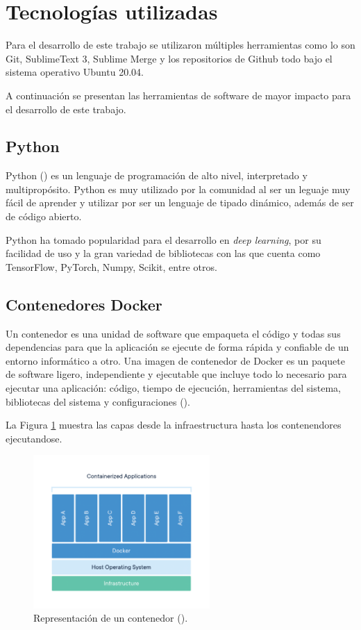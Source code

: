 \section{Tecnologías utilizadas}

Para el desarrollo de este trabajo se utilizaron múltiples herramientas como lo son Git, SublimeText 3, Sublime Merge y los repositorios de Github todo bajo el sistema operativo Ubuntu 20.04.

A continuación se presentan las herramientas de software de mayor impacto para el desarrollo de este trabajo.

\subsection{Python}

Python (\cite{python}) es un lenguaje de programación de alto nivel, interpretado y multipropósito. Python es muy utilizado por  la comunidad al ser un leguaje muy fácil de aprender y utilizar por ser un lenguaje de tipado dinámico, además de ser de código abierto.

Python ha tomado popularidad para el desarrollo en \textit{deep learning}, por su facilidad de uso y la gran variedad de bibliotecas con las que cuenta como TensorFlow, PyTorch, Numpy, Scikit, entre otros.

\subsection{Contenedores Docker}

Un contenedor es una unidad de software que empaqueta el código y todas sus dependencias para que la aplicación se ejecute de forma rápida y confiable de un entorno informático a otro. Una imagen de contenedor de Docker es un paquete de software ligero, independiente y ejecutable que incluye todo lo necesario para ejecutar una aplicación: código, tiempo de ejecución, herramientas del sistema, bibliotecas del sistema y configuraciones (\cite{docker2021container}).

La Figura \ref{fig:contenedorDocker} muestra las capas desde la infraestructura hasta los contenendores ejecutandose.

\begin{figure}[H]
    \centering
    \includegraphics[width=0.6\textwidth]{MarcoTeorico/imgs/container-what-is-container.png}
    \caption{Representación de un contenedor (\cite{docker2021container}).}
    \label{fig:contenedorDocker}
\end{figure}

